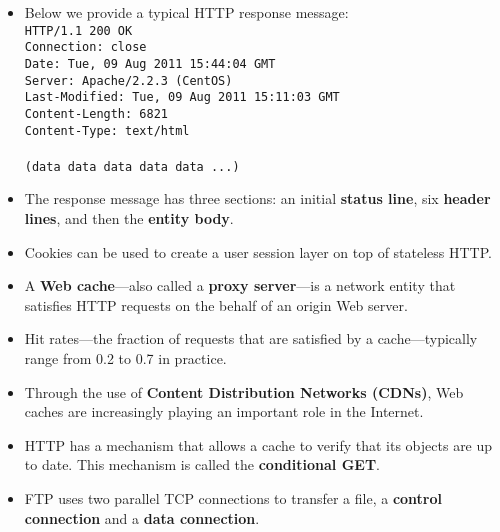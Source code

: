 \begin{itemize}
\item Below we provide a typical HTTP response message:\\
\hspace*{1em}\texttt{HTTP/1.1 200 OK}\\
\hspace*{1em}\texttt{Connection: close}\\
\hspace*{1em}\texttt{Date: Tue, 09 Aug 2011 15:44:04 GMT}\\
\hspace*{1em}\texttt{Server: Apache/2.2.3 (CentOS)}\\
\hspace*{1em}\texttt{Last-Modified: Tue, 09 Aug 2011 15:11:03 GMT}\\
\hspace*{1em}\texttt{Content-Length: 6821}\\
\hspace*{1em}\texttt{Content-Type: text/html}\\
\hspace*{1em}\\
\hspace*{1em}\texttt{(data data data data data ...)}

\item The response message has three sections: an initial \textbf{status line}, six \textbf{header lines}, and then the \textbf{entity body}.

\item Cookies can be used to create a user session layer on top of stateless HTTP.

\item A \textbf{Web cache}---also called a \textbf{proxy server}---is a network entity that satisfies HTTP requests on the behalf of an origin Web server.

\item Hit rates---the fraction of requests that are satisfied by a cache---typically range from 0.2 to 0.7 in practice.

\item Through the use of \textbf{Content Distribution Networks (CDNs)}, Web caches are increasingly playing an important role in the Internet.

\item HTTP has a mechanism that allows a cache to verify that its objects are up to date. This mechanism is called the \textbf{conditional GET}.

\item FTP uses two parallel TCP connections to transfer a file, a \textbf{control connection} and a \textbf{data connection}.


























\end{itemize}